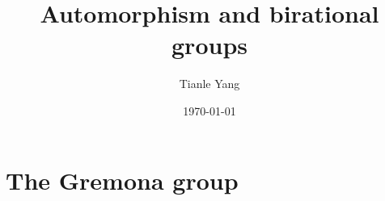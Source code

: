 \documentclass[sectionlevel=chapter,status=draft]{noteformyself}
\title{Automorphism and birational groups}
\author{Tianle Yang}
\date{\today}
\begin{document}
\maketitle

\tableofcontents

    \section[
      status=draft,
      tag=00000,
      label=\labelNFM{sec:automorphism-and-birational-groups:the-gremona-group}
    ]{The Gremona group}
    

\printbibliography[heading=bibintoc, title={References}]
\end{document}
